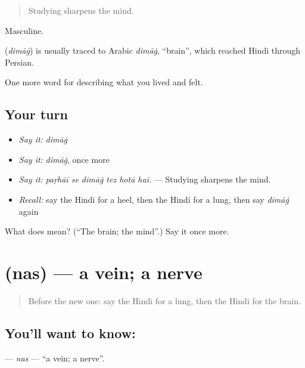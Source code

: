 \begin{quote}
Studying sharpens the mind.
\end{quote}

Masculine.

\begin{cousinweb}
\textbf{} (\emph{dimāġ}) is usually traced to Arabic \emph{dimāġ}, \textquotedblleft{}brain\textquotedblright{}, which reached Hindi through Persian.
\end{cousinweb}

\begin{grammarlens}[title={What you've built}]
One more word for describing what you lived and felt.
\end{grammarlens}

\subsection*{Your turn}
\begin{itemize}
\raggedright
  \item \emph{Say it:} \emph{dimāġ}
  \item \emph{Say it:} \emph{dimāġ}, once more
  \item \emph{Say it:} \emph{paṛhāī se dimāġ tez hotā hai.} — Studying sharpens the mind.
  \item \emph{Recall:} say the Hindi for a heel, then the Hindi for a lung, then say \emph{dimāġ} again
\end{itemize}

\begin{tcolorbox}[breakable,colback=teal!4,colframe=teal!35!black,title={Before you move on}]
What does  mean? (\textquotedblleft{}The brain; the mind\textquotedblright{}.) Say it once more.
\end{tcolorbox}
\section[\texorpdfstring{\hi{नस} (nas)}{नस (nas)}]{ (nas) — a vein; a nerve}

\label{lesson:HI-C478-nas}



\begin{quote}
Before the new one: say the Hindi for a lung, then the Hindi for the brain.
\end{quote}

\subsection*{You'll want to know: }
\textbf{} — \emph{nas} — \textquotedblleft{}a vein; a nerve\textquotedblright{}.

